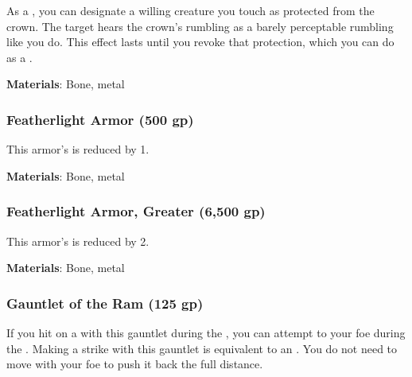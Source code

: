 As a , you can designate a willing creature you touch as protected from the crown.
The target hears the crown's rumbling as a barely perceptable rumbling like you do.
This effect lasts until you revoke that protection, which you can do as a .



\vspace{0.25em}
\textbf{Materials}: Bone, metal


\lowercase{\hypertarget{item:Featherlight Armor}{}}\label{item:Featherlight Armor}
\hypertarget{item:Featherlight Armor}{\subsubsection{Featherlight Armor\hfill{} (500 gp)}}

This armor's  is reduced by 1.



\vspace{0.25em}
\textbf{Materials}: Bone, metal


\lowercase{\hypertarget{item:Featherlight Armor, Greater}{}}\label{item:Featherlight Armor, Greater}
\hypertarget{item:Featherlight Armor, Greater}{\subsubsection{Featherlight Armor, Greater\hfill{} (6,500 gp)}}

This armor's  is reduced by 2.



\vspace{0.25em}
\textbf{Materials}: Bone, metal


\lowercase{\hypertarget{item:Gauntlet of the Ram}{}}\label{item:Gauntlet of the Ram}
\hypertarget{item:Gauntlet of the Ram}{\subsubsection{Gauntlet of the Ram\hfill{} (125 gp)}}

If you hit on a  with this gauntlet during the , you can attempt to  your foe during the .
Making a strike with this gauntlet is equivalent to an .
You do not need to move with your foe to push it back the full distance.



